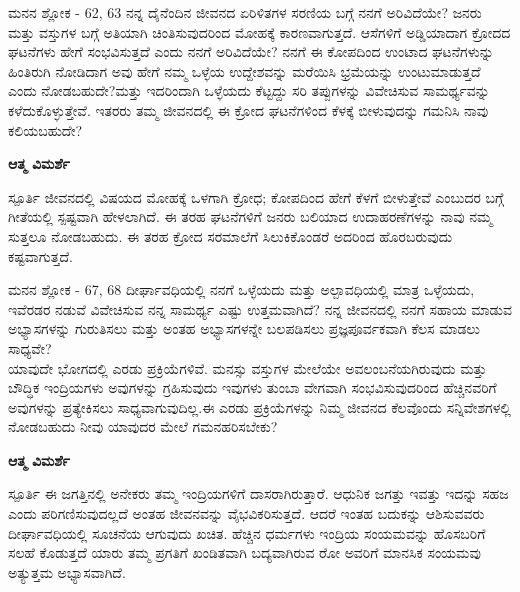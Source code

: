 \newpage
\begin{mananam}{\kanfont ಮನನ ಶ್ಲೋಕ - \textenglish{62, 63}}
\footnotesize \mananamfont ನನ್ನ ದೈನೆಂದಿನ ಜೀವನದ ಏರಿಳಿತಗಳ ಸರಣಿಯ ಬಗ್ಗೆ ನನಗೆ ಅರಿವಿದೆಯೇ? ಜನರು ಮತ್ತು ವಸ್ತುಗಳ ಬಗ್ಗೆ ಅತಿಯಾಗಿ ಚಿಂತಿಸುವುದರಿಂದ ಮೋಹಕ್ಕೆ ಕಾರಣವಾಗುತ್ತದೆ. ಆಸೆಗಳಿಗೆ  ಅಡ್ಡಿಯಾದಾಗ ಕ್ರೋದದ ಘಟನೆಗಳು ಹೇಗೆ ಸಂಭವಿಸುತ್ತದೆ ಎಂದು ನನಗೆ ಅರಿವಿದೆಯೇ? ನನಗೆ ಈ ಕೋಪದಿಂದ ಉಂಟಾದ ಘಟನೆಗಳುನ್ನು ಹಿಂತಿರುಗಿ ನೋಡಿದಾಗ ಅವು ಹೇಗೆ ನಮ್ಮ ಒಳ್ಳೆಯ ಉದ್ದೇಶವನ್ನು ಮರೆಯಿಸಿ ಭ್ರಮೆಯನ್ನು ಉಂಟುಮಾಡುತ್ತದೆ ಎಂದು ನೋಡಬಹುದೇ?ಮತ್ತು  ಇದರಿಂದಾಗಿ ಒಳ್ಳೆಯದು ಕೆಟ್ಟದ್ದು ಸರಿ ತಪ್ಪುಗಳನ್ನು ವಿವೇಚಿಸುವ ಸಾಮರ್ಥ್ಯವನ್ನು ಕಳೆದುಕೊಳ್ಳುತ್ತೇವೆ. ಇತರರು ತಮ್ಮ ಜೀವನದಲ್ಲಿ ಈ ಕ್ರೋದ ಘಟನೆಗಳಿಂದ ಕೆಳಕ್ಕೆ ಬೀಳುವುದನ್ನು ಗಮನಿಸಿ ನಾವು ಕಲಿಯಬಹುದೇ? 
\end{mananam}
\WritingHand\enspace\textbf{ಆತ್ಮ ವಿಮರ್ಶೆ}
\begin{inspiration}{\kanfont ಸ್ಪೂರ್ತಿ}
\footnotesize \mananamfont ಜೀವನದಲ್ಲಿ ವಿಷಯದ ಮೋಹಕ್ಕೆ ಒಳಗಾಗಿ ಕ್ರೋಧ; ಕೋಪದಿಂದ ಹೇಗೆ ಕೆಳಗೆ ಬೀಳುತ್ತೇವೆ ಎಂಬುದರ ಬಗ್ಗೆ ಗೀತೆಯಲ್ಲಿ ಸ್ಪಷ್ಟವಾಗಿ  ಹೇಳಲಾಗಿದೆ. ಈ ತರಹ ಘಟನೆಗಳಿಗೆ ಜನರು ಬಲಿಯಾದ ಉದಾಹರಣೆಗಳನ್ನು ನಾವು ನಮ್ಮ ಸುತ್ತಲೂ ನೋಡಬಹುದು. ಈ ತರಹ ಕ್ರೋದ ಸರಮಾಲೆಗೆ ಸಿಲುಕಿಕೊಂಡರೆ ಅದರಿಂದ ಹೊರಬರುವುದು ಕಷ್ಟವಾಗುತ್ತದೆ. 
\end{inspiration}
\newpage

\begin{mananam}{\kanfont ಮನನ ಶ್ಲೋಕ - \textenglish{67, 68}}
\footnotesize \mananamfont ದೀರ್ಘಾವಧಿಯಲ್ಲಿ ನನಗೆ ಒಳ್ಳೆಯದು ಮತ್ತು ಅಲ್ಪಾವಧಿಯಲ್ಲಿ ಮಾತ್ರ ಒಳ್ಳೆಯದು, ಇವೆರಡರ ನಡುವೆ ವಿವೇಚಿಸುವ ನನ್ನ ಸಾಮರ್ಥ್ಯ ಎಷ್ಟು ಉತ್ತಮವಾಗಿದೆ? ನನ್ನ ಜೀವನದಲ್ಲಿ ನನಗೆ ಸಹಾಯ ಮಾಡುವ ಅಭ್ಯಾಸಗಳನ್ನು ಗುರುತಿಸಲು ಮತ್ತು ಅಂತಹ ಅಭ್ಯಾಸಗಳನ್ನೇ ಬಲಪಡಿಸಲು ಪ್ರಜ್ಞಪೂರ್ವಕವಾಗಿ ಕೆಲಸ ಮಾಡಲು ಸಾಧ್ಯವೇ?\\
ಯಾವುದೇ ಭೋಗದಲ್ಲಿ ಎರಡು ಪ್ರಕ್ರಿಯೆಗಳಿವೆ. ಮನಸ್ಸು ವಸ್ತುಗಳ ಮೇಲೆಯೇ ಅವಲಂಬನೆಯಗಿರುವುದು ಮತ್ತು ಬೌದ್ಧಿಕ ಇಂದ್ರಿಯಗಳು ಅವುಗಳನ್ನು ಗ್ರಹಿಸುವುದು ಇವುಗಳು ತುಂಬಾ ವೇಗವಾಗಿ ಸಂಭವಿಸುವುದರಿಂದ ಹೆಚ್ಚಿನವರಿಗೆ ಅವುಗಳನ್ನು ಪ್ರತ್ಯೇಕಿಸಲು ಸಾಧ್ಯವಾಗುವುದಿಲ್ಲ.ಈ ಎರಡು ಪ್ರಕ್ರಿಯೆಗಳನ್ನು ನಿಮ್ಮ ಜೀವನದ ಕೆಲವೊಂದು ಸನ್ನಿವೇಶಗಳಲ್ಲಿ ನೋಡಬಹುದು ನೀವು ಯಾವುದರ ಮೇಲೆ ಗಮನಹರಿಸಬೇಕು?
\end{mananam}
\WritingHand\enspace\textbf{ಆತ್ಮ ವಿಮರ್ಶೆ}
\begin{inspiration}{\kanfont ಸ್ಪೂರ್ತಿ}
\footnotesize \mananamfont ಈ ಜಗತ್ತಿನಲ್ಲಿ ಅನೇಕರು ತಮ್ಮ ಇಂದ್ರಿಯಗಳಿಗೆ ದಾಸರಾಗಿರುತ್ತಾರೆ. ಆಧುನಿಕ ಜಗತ್ತು ಇವತ್ತು ಇದನ್ನು ಸಹಜ ಎಂದು ಪರಿಗಣಿಸುವುದಲ್ಲದೆ ಅಂತಹ ಜೀವನವನ್ನು ವೈಭವಿಕರಿಸುತ್ತದೆ. ಆದರೆ ಇಂತಹ ಬದುಕನ್ನು ಆಶಿಸುವವರು ದೀರ್ಘಾವಧಿಯಲ್ಲಿ ಸೂಚನೆಯ ಆಗುವುದು ಖಚಿತ. ಹೆಚ್ಚಿನ ಧರ್ಮಗಳು ಇಂದ್ರಿಯ ಸಂಯಮವನ್ನು ಹೊಸಬರಿಗೆ ಸಲಹೆ ಕೊಡುತ್ತದೆ ಯಾರು ತಮ್ಮ ಪ್ರಗತಿಗೆ ಖಂಡಿತವಾಗಿ ಬದ್ಯವಾಗಿರುವ ರೋ ಅವರಿಗೆ ಮಾನಸಿಕ ಸಂಯಮವು ಅತ್ಯುತ್ತಮ ಅಭ್ಯಾಸವಾಗಿದೆ.
\end{inspiration}
\newpage

